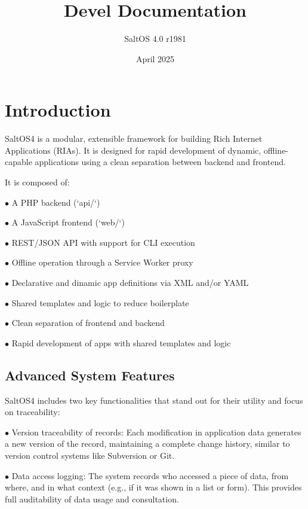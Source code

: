 \documentclass[a4paper]{article}
\title{Devel Documentation}
\author{SaltOS 4.0 r1981}
\begin{document}
\date{April 2025}
\maketitle
\clearpage

\tableofcontents
\clearpage


\hypertarget{toc1}{}
\section{Introduction}

SaltOS4 is a modular, extensible framework for building Rich Internet Applications (RIAs). It is designed for rapid development of dynamic, offline-capable applications using a clean separation between backend and frontend.

It is composed of:

\begin{compactitem}
\item[\color{myblue}$\bullet$] A PHP backend (`api/`)
\item[\color{myblue}$\bullet$] A JavaScript frontend (`web/`)
\item[\color{myblue}$\bullet$] REST/JSON API with support for CLI execution
\item[\color{myblue}$\bullet$] Offline operation through a Service Worker proxy
\item[\color{myblue}$\bullet$] Declarative and dinamic app definitions via XML and/or YAML
\item[\color{myblue}$\bullet$] Shared templates and logic to reduce boilerplate
\item[\color{myblue}$\bullet$] Clean separation of frontend and backend
\item[\color{myblue}$\bullet$] Rapid development of apps with shared templates and logic
\end{compactitem}

\hypertarget{toc2}{}
\subsection{Advanced System Features}

SaltOS4 includes two key functionalities that stand out for their utility and focus on traceability:

\begin{compactitem}
\item[\color{myblue}$\bullet$] Version traceability of records: Each modification in application data generates a new version of the record, maintaining a complete change history, similar to version control systems like Subversion or Git.
\item[\color{myblue}$\bullet$] Data access logging: The system records who accessed a piece of data, from where, and in what context (e.g., if it was shown in a list or form). This provides full auditability of data usage and consultation.
\end{compactitem}
\end{document}
